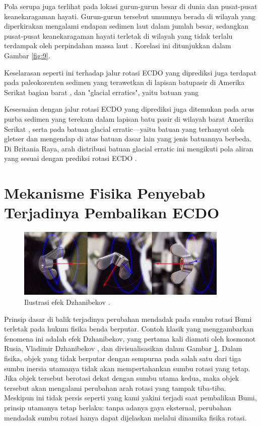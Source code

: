 \documentclass[10pt,twocolumn,letterpaper]{article}
\begin{document}
Pola serupa juga terlihat pada lokasi gurun-gurun besar di dunia dan pusat-pusat keanekaragaman hayati. Gurun-gurun tersebut umumnya berada di wilayah yang diperkirakan mengalami endapan sedimen laut dalam jumlah besar, sedangkan pusat-pusat keanekaragaman hayati terletak di wilayah yang tidak terlalu terdampak oleh perpindahan massa laut \cite{28}. Korelasi ini ditunjukkan dalam Gambar \ref{fig:9}.

Keselarasan seperti ini terhadap jalur rotasi ECDO yang diprediksi juga terdapat pada paleokorenten sedimen yang terawetkan di lapisan batupasir di Amerika Serikat bagian barat \cite{21}, dan "glacial erratics", yaitu batuan yang

Kesesuaian dengan jalur rotasi ECDO yang diprediksi juga ditemukan pada arus purba sedimen yang terekam dalam lapisan batu pasir di wilayah barat Amerika Serikat \cite{21}, serta pada batuan glacial erratic—yaitu batuan yang terhanyut oleh gletser dan mengendap di atas batuan dasar lain yang jenis batuannya berbeda. Di Britania Raya, arah distribusi batuan glacial erratic ini mengikuti pola aliran yang sesuai dengan prediksi rotasi ECDO \cite{67,68}.

\section{Mekanisme Fisika Penyebab Terjadinya Pembalikan ECDO}

\begin{figure}
\begin{center}

\includegraphics[width=0.9\textwidth]{dzhani.jpg}
\end{center}
   \caption{Ilustrasi efek Dzhanibekov \cite{28}.}
\label{fig:10}
\end{figure}

Prinsip dasar di balik terjadinya perubahan mendadak pada sumbu rotasi Bumi terletak pada hukum fisika benda berputar. Contoh klasik yang menggambarkan fenomena ini adalah efek Dzhanibekov, yang pertama kali diamati oleh kosmonot Rusia, Vladimir Dzhanibekov \cite{37}, dan divisualisasikan dalam Gambar \ref{fig:10}. Dalam fisika, objek yang tidak berputar dengan sempurna pada salah satu dari tiga sumbu inersia utamanya tidak akan mempertahankan sumbu rotasi yang tetap. Jika objek tersebut berotasi dekat dengan sumbu utama kedua, maka objek tersebut akan mengalami perubahan arah rotasi yang tampak tiba-tiba. Meskipun ini tidak persis seperti yang kami yakini terjadi saat pembalikan Bumi, prinsip utamanya tetap berlaku: tanpa adanya gaya eksternal, perubahan mendadak sumbu rotasi hanya dapat dijelaskan melalui dinamika fisika rotasi.
\end{document}
